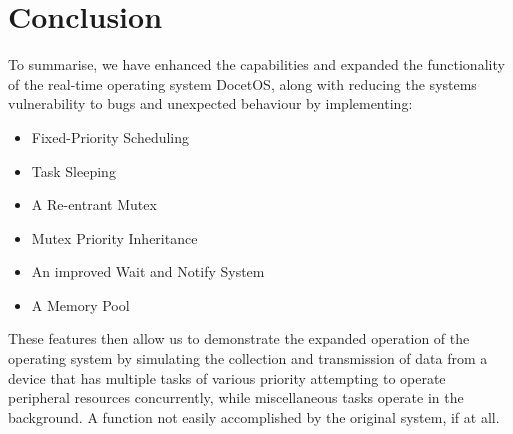 \section{Conclusion}
To summarise, we have enhanced the capabilities and expanded the functionality of the real-time operating system DocetOS, along with reducing the systems vulnerability to bugs and unexpected behaviour by implementing:
\begin{itemize}[]
	\item Fixed-Priority Scheduling
	\item Task Sleeping
	\item A Re-entrant Mutex
	\item Mutex Priority Inheritance
	\item An improved Wait and Notify System
	\item A Memory Pool
\end{itemize}
These features then allow us to demonstrate the expanded operation of the operating system by simulating the collection and transmission of data from a device that has multiple tasks of various priority attempting to operate peripheral resources concurrently, while miscellaneous tasks operate in the background. A function not easily accomplished by the original system, if at all.